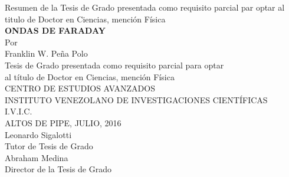 \thispagestyle{empty}

\begin{center}
Resumen de la Tesis de Grado presentada como requisito parcial par optar
al titulo de Doctor en Ciencias, mención Física\\
\vspace{1.5cm}
\textbf{ONDAS DE FARADAY}\\
\vspace{1.5cm}
Por\\
Franklin W. Peña Polo\\
\vspace{1cm}
Tesis de Grado presentada como requisito parcial para optar\\
al título de Doctor en Ciencias, mención Física\\
\vspace{1cm}
CENTRO DE ESTUDIOS AVANZADOS\\
INSTITUTO VENEZOLANO DE INVESTIGACIONES CIENTÍFICAS\\
I.V.I.C.\\
ALTOS DE PIPE, JULIO, 2016\\
\vspace{1cm}
Leonardo Sigalotti\\
Tutor de Tesis de Grado\\
Abraham Medina\\
Director de la Tesis de Grado\\
\end{center}

